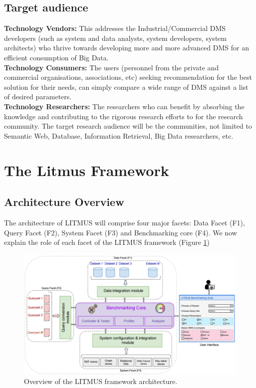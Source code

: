 \documentclass{llncs}
\begin{document}
    \subsection{Target audience}
            \textbf{Technology Vendors:}
            This addresses the Industrial/Commercial DMS developers (such as system and data analysts, system developers, system architects) who thrive towards developing more and more advanced DMS for an efficient consumption of Big Data.\\
            \textbf{Technology Consumers:}
            The users (personnel from the private and commercial organisations, associations, etc) seeking recommendation for the best solution for their needs, can simply compare a wide range of DMS against a list of desired parameters. \\
            \textbf{Technology Researchers:}
            The researchers who can benefit by absorbing the knowledge and contributing to the rigorous research efforts to for the research community. The target research audience will be the communities, not limited to Semantic Web, Database, Information Retrieval, Big Data researchers, etc.

\section{The Litmus Framework}\label{litmus_framework}
      \subsection{Architecture Overview}
        The architecture of LITMUS will comprise four major facets: Data Facet (F1), Query Facet (F2), System Facet (F3) and Benchmarking core (F4). We now explain the role of each facet of the LITMUS framework (Figure \ref{fig:benchmark_arch})
         
        \begin{figure}[h]
            \centering
            \includegraphics[scale=0.18]{images/benchmark_arch_latest_new}
            \caption{Overview of the LITMUS framework architecture.}
            \label{fig:benchmark_arch}
        \end{figure}
        
\end{document}
